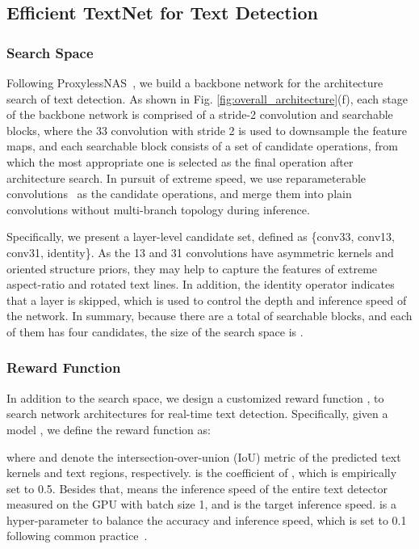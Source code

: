 \documentclass[lettersize,journal]{IEEEtran}
\begin{document}
\subsection{Efficient TextNet for Text Detection}

\subsubsection{Search Space}  
Following ProxylessNAS~\cite{cai2018proxylessnas}, we build a backbone network for the architecture search of text detection.
As shown in Fig. \ref{fig:overall_architecture}(f), each stage of the backbone network is comprised of a stride-2 convolution and  searchable blocks, where the 33 convolution with stride 2 is used to downsample the feature maps, and each searchable block consists of a set of candidate operations, from which the most appropriate one is selected as the final operation after architecture search.
In pursuit of extreme speed, we use reparameterable convolutions~\cite{ding2021repvgg} as the candidate operations, and merge them into plain convolutions without multi-branch topology during inference.

Specifically, we present a layer-level candidate set, defined as \{{\ttfamily conv33}, {\ttfamily conv13}, {\ttfamily conv31}, {\ttfamily identity}\}.
As the 13 and 31 convolutions have asymmetric kernels and oriented structure priors, they may help to capture the features of extreme aspect-ratio and rotated text lines.
In addition, the identity operator indicates that a layer is skipped, which is used to control the depth and inference speed of the network.
In summary, because there are a total of  searchable blocks, and each of them has four candidates, the size of the search space is .


\subsubsection{Reward Function}
In addition to the search space, we design a customized reward function , to search network architectures for real-time text detection.
Specifically, given a model , we define the reward function as:

where  and  denote the intersection-over-union (IoU) metric of the predicted text kernels and text regions, respectively. 
 is the coefficient of , which is empirically set to 0.5.
Besides that,  means the inference speed of the entire text detector measured on the GPU with batch size 1, and  is the target inference speed.  is a hyper-parameter to balance the accuracy and inference speed, which is set to 0.1 following common practice~\cite{cai2018proxylessnas}.
\end{document}
